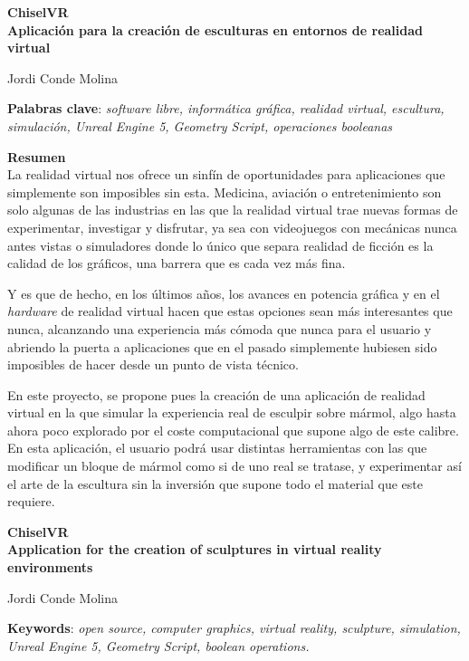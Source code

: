 \thispagestyle{empty}

\begin{center}
{\large\bfseries ChiselVR \\ Aplicación para la creación de esculturas en entornos de realidad virtual }\\
\end{center}
\begin{center}
Jordi Conde Molina\\
\end{center}


\vspace{0.5cm}
\noindent\textbf{Palabras clave}: \textit{software libre, informática gráfica, realidad virtual, escultura, simulación, Unreal Engine 5, Geometry Script, operaciones booleanas}
\vspace{0.7cm}

\noindent\textbf{Resumen}\\
La realidad virtual nos ofrece un sinfín de oportunidades para aplicaciones que simplemente son imposibles sin esta. Medicina, aviación o entretenimiento son solo algunas de las industrias en las que la realidad virtual trae nuevas formas de experimentar, investigar y disfrutar, ya sea con videojuegos con mecánicas nunca antes vistas o simuladores donde lo único que separa realidad de ficción es la calidad de los gráficos, una barrera que es cada vez más fina.

Y es que de hecho, en los últimos años, los avances en potencia gráfica y en el \textit{hardware} de realidad virtual hacen que estas opciones sean más interesantes que nunca, alcanzando una experiencia más cómoda que nunca para el usuario y abriendo la puerta a aplicaciones que en el pasado simplemente hubiesen sido imposibles de hacer desde un punto de vista técnico.

En este proyecto, se propone pues la creación de una aplicación de realidad virtual en la que simular la experiencia real de esculpir sobre mármol, algo hasta ahora poco explorado por el coste computacional que supone algo de este calibre. En esta aplicación, el usuario podrá usar distintas herramientas con las que modificar un bloque de mármol como si de uno real se tratase, y experimentar así el arte de la escultura sin la inversión que supone todo el material que este requiere.

\cleardoublepage

\begin{center}
	{\large\bfseries ChiselVR \\ Application for the creation of sculptures in virtual reality environments}\\
\end{center}
\begin{center}
	Jordi Conde Molina\\
\end{center}
\vspace{0.5cm}
\noindent\textbf{Keywords}: \textit{open source, computer graphics, virtual reality, sculpture, simulation, Unreal Engine 5, Geometry Script, boolean operations.}
\vspace{0.7cm}

